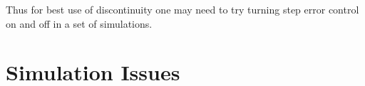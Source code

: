 Thus for best use of discontinuity one may need to try turning step error control on and
off in a set of simulations.

\section{Simulation Issues}
\label{SimulationIssues}


